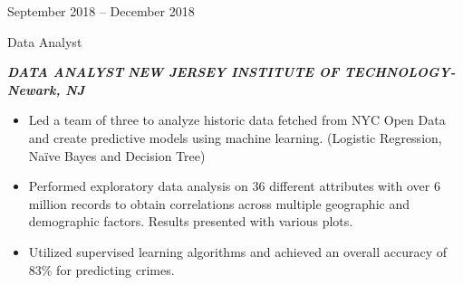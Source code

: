 \documentclass[a4paper,10pt]{article}
\newlength{\cvcolumngapwidth}
\newlength{\cvleftcolumnwidth}
\newlength{\cvrightcolumnwidth}
\newcommand{\cvtitlestyle}[1]{{\large\cvtitlefont\textcolor{cvtitlecolor}{#1}}}
\newcommand{\cvdurationstyle}[1]{{\small\cvdurationfont\textcolor{cvdurationcolor}{#1}}}
\newlength{\cvafteritemskipamount}
\newlength{\cvaftertitleskipamount}
\newlength{\cvparskip}
\newcommand{\cvitem}[2]{
    \begin{minipage}[t]{\cvleftcolumnwidth}
        \raggedleft #1
    \end{minipage}%
    \hspace{\cvcolumngapwidth}%
    \begin{minipage}[t]{\cvrightcolumnwidth}
        \setlength{\parskip}{\cvparskip} #2
    \end{minipage}

    \vspace{\cvafteritemskipamount}
}
\newcommand{\cvtitle}[1]{
    \cvtitlestyle{#1}

    \vspace{\cvaftertitleskipamount}
    \vspace{-\cvparskip}
}
\begin{document}
\cvitem{
    \cvdurationstyle{September 2018 -- December 2018}
}{
    \cvtitle{Data Analyst}

   \textcolor{cvwhatcolor}{\emph{\textbf{{DATA ANALYST}}}}
    \textcolor{cvwherecolor}{\textbf{\textbar}}
    \textcolor{cvwherecolor}{\emph{\textbf{NEW JERSEY INSTITUTE OF TECHNOLOGY- Newark, NJ}}}

\begin{itemize}[leftmargin=*]
       \item Led a team of three to analyze historic data fetched from NYC Open Data and create predictive models using machine learning. (Logistic Regression, Naïve Bayes and Decision Tree)
       \item Performed exploratory data analysis on 36 different attributes with over 6 million records to obtain correlations across multiple geographic and demographic factors. Results presented with various plots.
       \item Utilized supervised learning algorithms and achieved an overall accuracy of 83\% for predicting crimes.
  
   \end{itemize}



}
\end{document}
